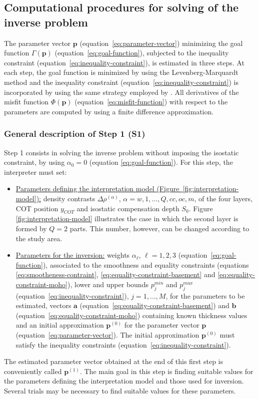 \documentclass[manuscript]{geophysics}
\begin{document}
\subsection{Computational procedures for solving of the inverse problem}

The parameter vector $\mathbf{p}$ (equation~\ref{eq:parameter-vector}) minimizing the
goal function $\Gamma (\mathbf{p})$ (equation~\ref{eq:goal-function}), subjected to
the inequality constraint (equation~\ref{eq:inequality-constraint}), is estimated 
in three steps. At each step, the goal function is minimized by using the Levenberg-Marquardt 
method \citep{silva-etal2001, aster-etal2005} and the inequality constraint 
(equation~\ref{eq:inequality-constraint}) is incorporated by using the same strategy 
employed by \citet{barbosa-etal1999}.
All derivatives of the misfit function $\Phi(\mathbf{p})$ (equation~\ref{eq:misfit-function})
with respect to the parameters are computed by using a finite difference approximation.

\subsubsection{General description of Step 1 (S1)}

Step 1 consists in solving the inverse problem without imposing the isostatic
constraint, by using $\alpha_{0} = 0$ (equation \ref{eq:goal-function}). For this step,
the interpreter must set:
\begin{itemize}
	\item \underline{Parameters defining the interpretation model
	(Figure~\ref{fig:interpretation-model}):} density contrasts $\Delta \rho^{(\alpha)}$, 
	$\alpha = w, 1, \dots, Q, cc, oc, m$, of the four layers, COT position $y_{COT}$ and
	isostatic compensation depth $S_{0}$. Figure \ref{fig:interpretation-model} illustrates 
	the case in which the second layer is formed by $Q = 2$ parts. This number, however, 
	can be changed according to the study area.
	\item \underline{Parameters for the inversion:} weights $\alpha_{\ell}$,
	$\ell = 1, 2, 3$ (equation~\ref{eq:goal-function}), associated to the 
	smoothness and equality constraints (equations \ref{eq:smootheness-contraint},
	\ref{eq:equality-constraint-basement} and \ref{eq:equality-constraint-moho}),
	lower and upper bounds $p_{j}^{min}$ and $p_{j}^{max}$
	(equation~\ref{eq:inequality-constraint}), $j = 1, \dots, M$,
	for the parameters to be estimated, vectors $\mathbf{a}$ 
	(equation~\ref{eq:equality-constraint-basement}) and $\mathbf{b}$
	(equation~\ref{eq:equality-constraint-moho}) containing known thickness values
	and an initial approximation $\mathbf{p}^{(0)}$ for the parameter vector $\mathbf{p}$
	(equation~\ref{eq:parameter-vector}). The initial approximation $\mathbf{p}^{(0)}$
	must satisfy the inequality constraints (equation~\ref{eq:inequality-constraint}).
\end{itemize}
The estimated parameter vector obtained at the end of this first step is conveniently called
$\mathbf{p}^{(1)}$. The main goal in this step is finding suitable values for the parameters
defining the interpretation model and those used for inversion. Several trials may be
necessary to find suitable values for these parameters.
\end{document}
